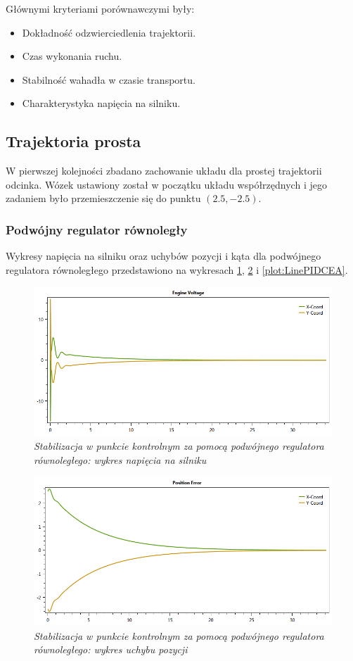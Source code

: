 \documentclass[12pt, oneside]{report}
\theoremstyle{definition}
\begin{document}
Głównymi kryteriami porównawczymi były: 
\begin{itemize}
\item Dokładność odzwierciedlenia trajektorii.
\item Czas wykonania ruchu.
\item Stabilność wahadła w czasie transportu.
\item Charakterystyka napięcia na silniku.
\end{itemize}

\subsection{Trajektoria prosta}
W pierwszej kolejności zbadano zachowanie układu dla prostej trajektorii odcinka. Wózek ustawiony został w początku układu współrzędnych i jego zadaniem było przemieszczenie się do punktu $(2.5,-2.5)$.

\subsubsection{Podwójny regulator równoległy}
Wykresy napięcia na silniku oraz uchybów pozycji i kąta dla podwójnego regulatora równoległego przedstawiono na wykresach \ref{plot:LinePIDEV}, \ref{plot:LinePIDCEP} i \ref{plot:LinePIDCEA}.

\begin{figure}[H]
	\centering
		\includegraphics[width = 350pt]{LinePIDEV} 
		\caption{\textit{Stabilizacja w punkcie kontrolnym za pomocą podwójnego regulatora równoległego: wykres napięcia na silniku}}
		\label{plot:LinePIDEV}
\end{figure}

\begin{figure}[H]
	\centering
		\includegraphics[width = 350pt]{LinePIDCEP} 
		\caption{\textit{Stabilizacja w punkcie kontrolnym za pomocą podwójnego regulatora równoległego: wykres uchybu pozycji}}
		\label{plot:LinePIDCEP}
\end{figure}
\end{document}
